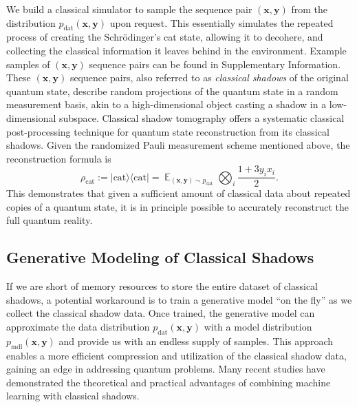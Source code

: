 \documentclass[fleqn,11pt]{wlscirep}
\newcommand{\bra}[1]{\langle #1|}
\newcommand{\ket}[1]{|#1 \rangle}
\newcommand{\dsE}{\mathbb{E}}
\newcommand{\vect}[1]{{\bm{#1}}}
\newcommand{\eq}[1]{\begin{equation}#1\end{equation}}
\begin{document}
We build a classical simulator to sample the sequence pair $(\vect{x},\vect{y})$ from the distribution $p_\text{dat}(\vect{x},\vect{y})$ upon request. This essentially simulates the repeated process of creating the Schrödinger's cat state, allowing it to decohere, and collecting the classical information it leaves behind in the environment. Example samples of $(\vect{x},\vect{y})$ sequence pairs can be found in Supplementary Information. These $(\vect{x},\vect{y})$ sequence pairs, also referred to as \emph{classical shadows} of the original quantum state, describe random projections of the quantum state in a random measurement basis, akin to a high-dimensional object casting a shadow in a low-dimensional subspace. Classical shadow tomography offers a systematic classical post-processing technique for quantum state reconstruction from its classical shadows\cite{Ohliger2013E1204.5735, Guta2018F1809.11162, Huang2020P2002.08953}. Given the randomized Pauli measurement scheme mentioned above, the reconstruction formula is
\eq{\label{eq: rec cat}
\rho_\text{cat}:=\ket{\text{cat}}\bra{\text{cat}}=\mathop{\dsE}_{(\vect{x},\vect{y})\sim p_\text{dat}}\bigotimes_i\frac{1+3y_ix_i}{2}.}
This demonstrates that given a sufficient amount of classical data about repeated copies of a quantum state, it is in principle possible to accurately reconstruct the full quantum reality.

\subsection*{Generative Modeling of Classical Shadows}

If we are short of memory resources to store the entire dataset of classical shadows, a potential workaround is to train a generative model ``on the fly'' as we collect the classical shadow data. Once trained, the generative model can approximate the data distribution $p_\text{dat}(\vect{x},\vect{y})$ with a model distribution $p_\text{mdl}(\vect{x},\vect{y})$ and provide us with an endless supply of samples. This approach enables a more efficient compression and utilization of the classical shadow data, gaining an edge in addressing quantum problems. Many recent studies \cite{Li2020V2012.08288, Huang2021P2011.01938, Huang2021I2101.02464, Huang2021P2106.12627, Huang2022Q2112.00778, Van-Kirk2022H2212.06084, Wei2023N2305.01078, Jerbi2023S2306.00061} have demonstrated the theoretical and practical advantages of combining machine learning with classical shadows.
\end{document}
